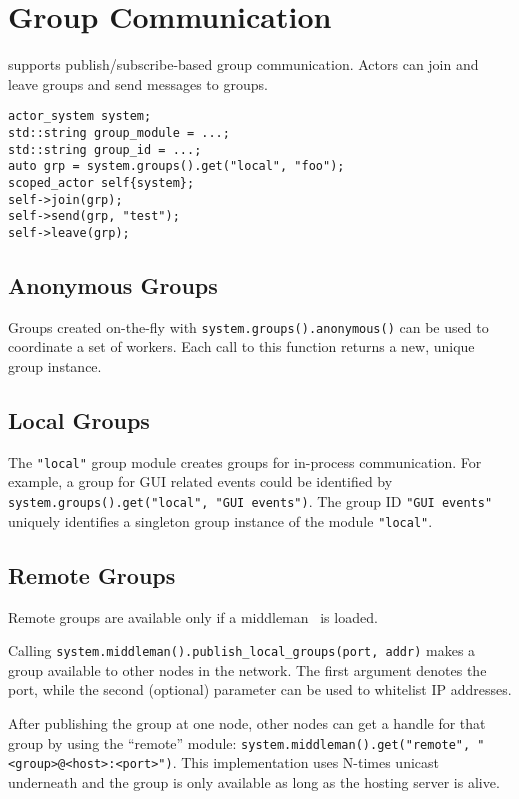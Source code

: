 \section{Group Communication}
\label{groups}

\lib supports publish/subscribe-based group communication.
Actors can join and leave groups and send messages to groups.

\begin{lstlisting}
actor_system system;
std::string group_module = ...;
std::string group_id = ...;
auto grp = system.groups().get("local", "foo");
scoped_actor self{system};
self->join(grp);
self->send(grp, "test");
self->leave(grp);
\end{lstlisting}

\subsection{Anonymous Groups}
\label{anonymous-group}

Groups created on-the-fly with \lstinline^system.groups().anonymous()^ can be used to coordinate a set of workers.
Each call to this function returns a new, unique group instance.

\subsection{Local Groups}
\label{local-group}

The \lstinline^"local"^ group module creates groups for in-process communication.
For example, a group for GUI related events could be identified by \lstinline^system.groups().get("local", "GUI events")^.
The group ID \lstinline^"GUI events"^ uniquely identifies a singleton group instance of the module \lstinline^"local"^.

\subsection{Remote Groups}
\label{remote-group}

Remote groups are available only if a middleman~ is loaded.

Calling \lstinline^system.middleman().publish_local_groups(port, addr)^ makes a group available to other nodes in the network. The first argument denotes the port, while the second (optional) parameter can be used to whitelist IP addresses.

After publishing the group at one node, other nodes can get a handle for that group by using the ``remote'' module:  \lstinline^system.middleman().get("remote", "<group>@<host>:<port>")^. This implementation uses N-times unicast underneath and the group is only available as long as the hosting server is alive.

